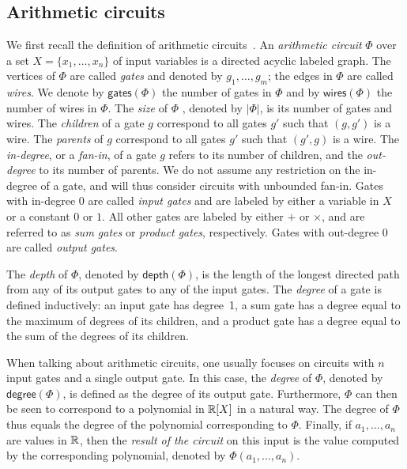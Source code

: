 \subsection{Arithmetic circuits}\label{subsect:ac}
We first recall the definition of arithmetic circuits~\cite{allender}. 
%
An \textit{arithmetic circuit} $\Phi$ over a set $X=\{x_1,\ldots,x_n\}$ of input variables 
is a directed acyclic labeled graph. The vertices of $\Phi$ are called \textit{gates} and 
denoted by $g_1,\ldots,g_m$; the edges in $\Phi$ are called \textit{wires}. We denote by 
$\mathsf{gates}(\Phi)$ the number of gates in $\Phi$ and by $\mathsf{wires}(\Phi)$ the number
of wires in $\Phi$. The \textit{size} of $\Phi$
, denoted by $|\Phi|$, 
is its number of gates and wires. 
%
The \textit{children} of a gate $g$ correspond to all gates $g'$ such that $(g,g')$ is a wire. 
The \textit{parents} of $g$ correspond to all gates $g'$ such that $(g',g)$ is a wire. The
\textit{in-degree}, or a \textit{fan-in}, of a gate $g$ refers to its number of children, and 
the \textit{out-degree} to its number of parents. We do not assume any restriction on the 
in-degree of a gate, and will thus consider circuits with unbounded fan-in. 
Gates with in-degree $0$ are called \textit{input gates} and are labeled by either a variable 
in $X$ or a constant $0$ or $1$. All other gates are labeled by either $+$ or $\times$, and 
are referred to as \textit{sum gates} or \textit{product gates}, respectively.
Gates with out-degree $0$ are called \textit{output gates}.


%
The \textit{depth} of $\Phi$, denoted
by $\mathsf{depth}(\Phi)$, is the length of the longest directed path from any of its output 
gates to any of the input gates. The \textit{degree} of a gate is defined inductively: an input 
gate has degree~1, a sum gate has a degree equal to the maximum of degrees of its children, 
and a product gate has a degree equal to the sum of the degrees of its children. 

When talking about arithmetic circuits, one usually focuses on circuits with $n$ input gates and a single output gate. In this case, 
the \textit{degree} of $\Phi$, denoted by $\mathsf{degree}(\Phi)$, is defined as the degree of its output gate. Furthermore, 
$\Phi$ can then be seen to correspond to a polynomial in $\mathbb{R}[X]$ in a natural way. The {degree} of $\Phi$ thus equals 
the degree of the polynomial corresponding to $\Phi$. Finally, if $a_1,\ldots ,a_n$ are values in $\mathbb{R}$, then 
the \textit{result of the circuit} on this input is the value computed by the corresponding polynomial, denoted by $\Phi(a_1,\ldots ,a_n)$.

